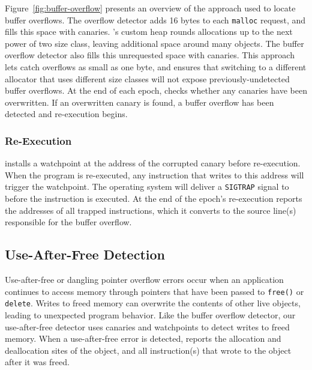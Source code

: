Figure~\ref{fig:buffer-overflow} presents an overview of the approach used to locate buffer overflows. The overflow detector adds 16 bytes to each \texttt{malloc} request, and fills this space with canaries. \doubletake{}'s custom heap rounds allocations up to the next power of two size class, leaving additional space around many objects. The buffer overflow detector also fills this unrequested space with canaries. This approach lets \doubletake{} catch overflows as small as one byte, and ensures that switching to a different allocator that uses different size classes will not expose previously-undetected buffer overflows. At the end of each epoch, \doubletake{} checks whether any canaries have been overwritten. If an overwritten canary is found, a buffer overflow has been detected and re-execution begins.

\subsubsection*{Re-Execution}

\doubletake{} installs a watchpoint at the address of the corrupted canary before re-execution. When the program is re-executed, any instruction that writes to this address will trigger the watchpoint. The operating system will deliver a \texttt{SIGTRAP} signal to \doubletake{} before the instruction is executed. At the end of the epoch's re-execution \doubletake{} reports the addresses of all trapped instructions, which it converts to the source line(s) responsible for the buffer overflow.


\subsection{Use-After-Free Detection}
\label{sec:applications/useafterfree}
 
Use-after-free or dangling pointer overflow errors occur when an application continues to access memory through pointers that have been passed to \texttt{free()} or \texttt{delete}. Writes to freed memory can overwrite the contents of other live objects, leading to unexpected program behavior. Like the buffer overflow detector, our use-after-free detector uses canaries and watchpoints to detect writes to freed memory. When a use-after-free error is detected, \doubletake{} reports the allocation and deallocation sites of the object, and all instruction(s) that wrote to the object after it was freed.

